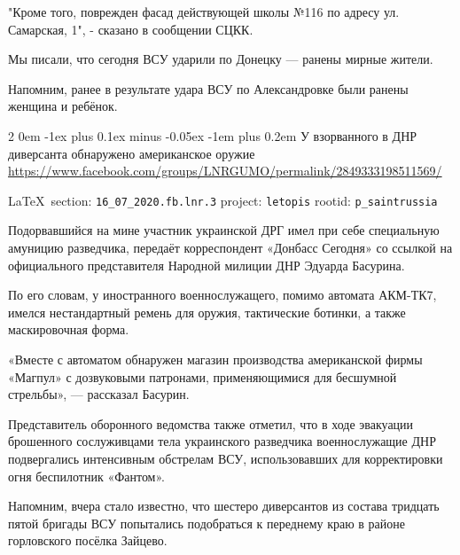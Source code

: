 \documentclass[a4paper,11pt]{extreport}
\makeatletter
\renewcommand\subsection{%
  \clearpage
    \@startsection{subsection}%
    {2}%
    {0em}%
    {-1ex plus 0.1ex minus -0.05ex}%
    {-1em plus 0.2em}%
    {\scshape\bfseries\Large}%
}
\makeatother
\begin{document}
"Кроме того, поврежден фасад действующей школы №116 по адресу ул. Самарская,
1", - сказано в сообщении СЦКК.

Мы писали, что сегодня ВСУ ударили по Донецку --- ранены мирные жители.

Напомним, ранее в результате удара ВСУ по Александровке были ранены женщина и
ребёнок.
 
 
\subsection{У взорванного в ДНР диверсанта обнаружено американское оружие}
\label{sec:16_07_2020.fb.lnr.3}
\url{https://www.facebook.com/groups/LNRGUMO/permalink/2849333198511569/}
  
\vspace{0.5cm}
{\ifDEBUG\small\LaTeX~section: \verb|16_07_2020.fb.lnr.3| project: \verb|letopis| rootid: \verb|p_saintrussia|\fi}
\vspace{0.5cm}
  
Подорвавшийся на мине участник украинской ДРГ имел при себе специальную амуницию разведчика, передаёт корреспондент «Донбасс Сегодня» со ссылкой на официального представителя Народной милиции ДНР Эдуарда Басурина.

По его словам, у иностранного военнослужащего, помимо автомата АКМ-ТК7, имелся нестандартный ремень для оружия, тактические ботинки, а также маскировочная форма.

«Вместе с автоматом обнаружен магазин производства американской фирмы «Магпул» с дозвуковыми патронами, применяющимися для бесшумной стрельбы», --- рассказал Басурин.

Представитель оборонного ведомства также отметил, что в ходе эвакуации брошенного сослуживцами тела украинского разведчика военнослужащие ДНР подвергались интенсивным обстрелам ВСУ, использовавших для корректировки огня беспилотник «Фантом».

Напомним, вчера стало известно, что шестеро диверсантов из состава тридцать пятой бригады ВСУ попытались подобраться к переднему краю в районе горловского посёлка Зайцево.
 
\end{document}
